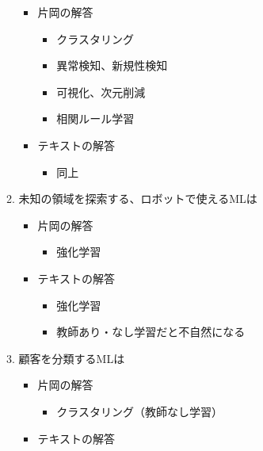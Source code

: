 \begin{itemize}
\begin{enumerate}
    \begin{itemize}
    \tightlist
    \item
      片岡の解答

      \begin{itemize}
      \tightlist
      \item
        クラスタリング
      \item
        異常検知、新規性検知
      \item
        可視化、次元削減
      \item
        相関ルール学習
      \end{itemize}
    \item
      テキストの解答

      \begin{itemize}
      \tightlist
      \item
        同上
      \end{itemize}
    \end{itemize}
  \item
    未知の領域を探索する、ロボットで使えるMLは

    \begin{itemize}
    \tightlist
    \item
      片岡の解答

      \begin{itemize}
      \tightlist
      \item
        強化学習
      \end{itemize}
    \item
      テキストの解答

      \begin{itemize}
      \tightlist
      \item
        強化学習
      \item
        教師あり・なし学習だと不自然になる
      \end{itemize}
    \end{itemize}
  \item
    顧客を分類するMLは

    \begin{itemize}
    \tightlist
    \item
      片岡の解答

      \begin{itemize}
      \tightlist
      \item
        クラスタリング（教師なし学習）
      \end{itemize}
    \item
      テキストの解答


\end{itemize}
\end{enumerate}
\end{itemize}
